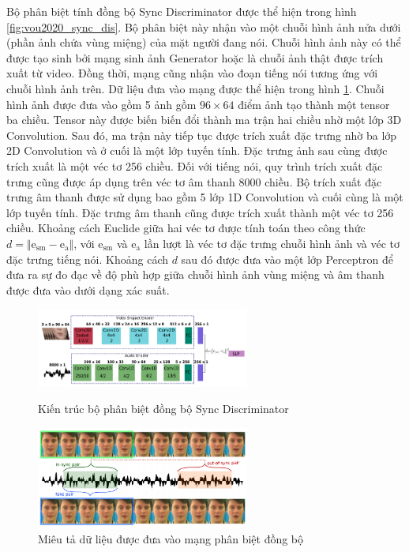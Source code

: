 Bộ phân biệt tính đồng bộ Sync Discriminator được thể hiện trong hình \ref{fig:vou2020_sync_dis}. Bộ phân biệt này nhận vào một chuỗi hình ảnh nửa dưới (phần ảnh chứa vùng miệng) của mặt người đang nói. Chuỗi hình ảnh này có thể được tạo sinh bởi mạng sinh ảnh Generator hoặc là chuỗi ảnh thật được trích xuất từ video. Đồng thời, mạng cũng nhận vào đoạn tiếng nói tương ứng với chuỗi hình ảnh trên. Dữ liệu đưa vào mạng được thể hiện trong hình \ref{fig:vou2020_sync_input}. Chuỗi hình ảnh được đưa vào gồm 5 ảnh gồm $96 \times 64$ điểm ảnh tạo thành một tensor ba chiều. Tensor này được biến biến đổi thành ma trận hai chiều nhờ một lớp 3D Convolution. Sau đó, ma trận này tiếp tục được trích xuất đặc trưng nhờ ba lớp 2D Convolution và ở cuối là một lớp tuyến tính. Đặc trưng ảnh sau cùng được trích xuất là một véc tơ 256 chiều. Đối với tiếng nói, quy trình trích xuất đặc trưng cũng được áp dụng trên véc tơ âm thanh 8000 chiều. Bộ trích xuất đặc trưng âm thanh được sử dụng bao gồm 5 lớp 1D Convolution và cuối cùng là một lớp tuyến tính. Đặc trưng âm thanh cũng được trích xuất thành một véc tơ 256 chiều. Khoảng cách Euclide giữa hai véc tơ được tính toán theo công thức $d = \Vert \textrm{e}_{\textrm{sm}} - \textrm{e}_{\textrm{a}} \Vert$, với $\textrm{e}_{\textrm{sm}}$ và $\textrm{e}_{\textrm{a}}$ lần lượt là véc tơ đặc trưng chuỗi hình ảnh và véc tơ đặc trưng tiếng nói. Khoảng cách $d$ sau đó được đưa vào một lớp Perceptron để đưa ra sự đo đạc về độ phù hợp giữa chuỗi hình ảnh vùng miệng và âm thanh được đưa vào dưới dạng xác suất.

\begin{figure}[H]
    \centering
    \begin{minipage}{0.48\textwidth}
        \includegraphics[width=7cm]{./content/images/vou2020_sync_dis.png}
        \caption{Kiến trúc bộ phân biệt đồng bộ Sync Discriminator}
        \label{fig:vou2020_sync_dis}
    \end{minipage}\hfill
    \begin{minipage}{0.48\textwidth}
        \includegraphics[width=7cm]{./content/images/vou2020_sync_input.png}
        \caption{Miêu tả dữ liệu được đưa vào mạng phân biệt đồng bộ}
        \label{fig:vou2020_sync_input}
    \end{minipage}
\end{figure}

